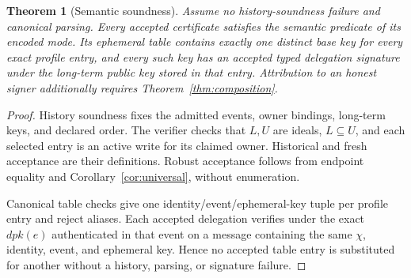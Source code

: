 \documentclass[11pt]{article}
\newtheorem{theorem}{Theorem}[section]
\theoremstyle{definition}
\begin{document}
\begin{theorem}[Semantic soundness]\label{thm:semantic-soundness}
Assume no history-soundness failure and canonical parsing.  Every accepted certificate satisfies the semantic predicate of its encoded mode.  Its ephemeral table contains exactly one distinct base key for every exact profile entry, and every such key has an accepted typed delegation signature under the long-term public key stored in that entry.  Attribution to an honest signer additionally requires Theorem~\ref{thm:composition}.
\end{theorem}
\begin{proof}
History soundness fixes the admitted events, owner bindings, long-term keys, and declared order.  The verifier checks that $L,U$ are ideals, $L\subseteq U$, and each selected entry is an active write for its claimed owner.  Historical and fresh acceptance are their definitions.  Robust acceptance follows from endpoint equality and Corollary~\ref{cor:universal}, without enumeration.

Canonical table checks give one identity/event/ephemeral-key tuple per profile entry and reject aliases.  Each accepted delegation verifies under the exact $dpk(e)$ authenticated in that event on a message containing the same $\chi$, identity, event, and ephemeral key.  Hence no accepted table entry is substituted for another without a history, parsing, or signature failure.
\end{proof}
\end{document}
